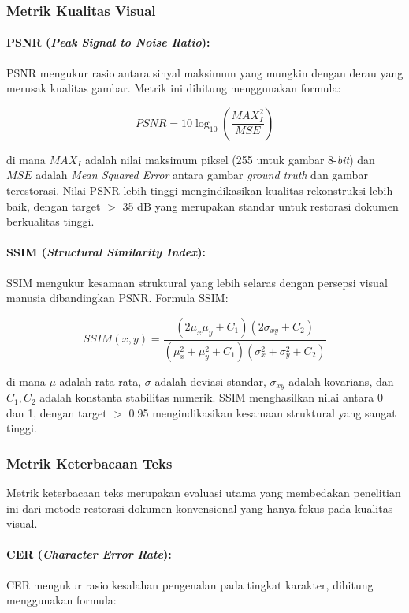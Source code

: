\documentclass[12pt,a4paper]{article}
\begin{document}
\subsubsection{Metrik Kualitas Visual}
\paragraph{PSNR (\textit{Peak Signal to Noise Ratio}):}
PSNR mengukur rasio antara sinyal maksimum yang mungkin dengan derau yang merusak kualitas gambar. Metrik ini dihitung menggunakan formula:

\begin{equation}
PSNR = 10 \log_{10} \left( \frac{MAX_I^2}{MSE} \right)
\end{equation}

di mana $MAX_I$ adalah nilai maksimum piksel (255 untuk gambar 8-\textit{bit}) dan $MSE$ adalah \textit{Mean Squared Error} antara gambar \textit{ground truth} dan gambar terestorasi. Nilai PSNR lebih tinggi mengindikasikan kualitas rekonstruksi lebih baik, dengan target $>$ 35 dB yang merupakan standar untuk restorasi dokumen berkualitas tinggi.

\paragraph{SSIM (\textit{Structural Similarity Index}):}
SSIM mengukur kesamaan struktural yang lebih selaras dengan persepsi visual manusia dibandingkan PSNR. Formula SSIM:

\begin{equation}
SSIM(x, y) = \frac{(2\mu_x\mu_y + C_1)(2\sigma_{xy} + C_2)}{(\mu_x^2 + \mu_y^2 + C_1)(\sigma_x^2 + \sigma_y^2 + C_2)}
\end{equation}

di mana $\mu$ adalah rata-rata, $\sigma$ adalah deviasi standar, $\sigma_{xy}$ adalah kovarians, dan $C_1, C_2$ adalah konstanta stabilitas numerik. SSIM menghasilkan nilai antara 0 dan 1, dengan target $>$ 0.95 mengindikasikan kesamaan struktural yang sangat tinggi.

\subsubsection{Metrik Keterbacaan Teks}
Metrik keterbacaan teks merupakan evaluasi utama yang membedakan penelitian ini dari metode restorasi dokumen konvensional yang hanya fokus pada kualitas visual.

\paragraph{CER (\textit{Character Error Rate}):}
CER mengukur rasio kesalahan pengenalan pada tingkat karakter, dihitung menggunakan formula:
\end{document}
